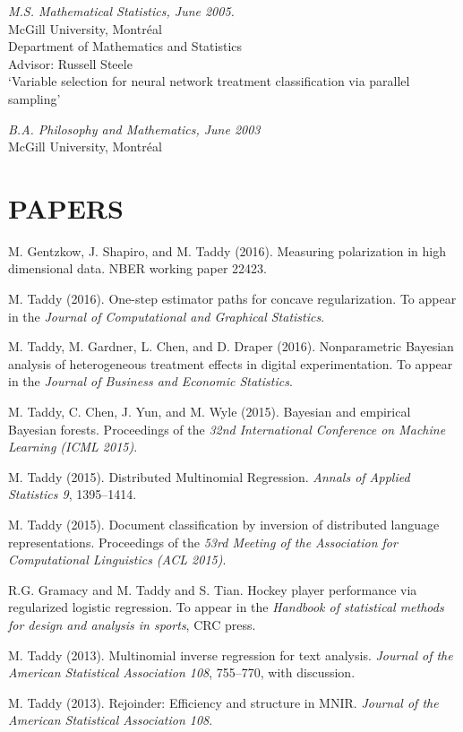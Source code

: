 \documentclass[margin,line]{res}
\begin{document}
\begin{resume}
\vspace{-0.2cm}
{\it M.S. Mathematical Statistics, June 2005.}\\
{\sc McGill University, Montr\'eal}\\
Department of Mathematics and Statistics\\
Advisor: Russell Steele\\
`Variable selection for neural network treatment classification via parallel sampling'

\vspace{-0.2cm}
{\it B.A. Philosophy and Mathematics, June 2003}\\
{\sc McGill University, Montr\'eal}


\section{\bf PAPERS}


M. Gentzkow, J. Shapiro, and M. Taddy (2016).  Measuring polarization in high dimensional data. NBER working paper 22423.

M. Taddy (2016). One-step estimator paths for concave regularization.  To appear in the {\em Journal of Computational and Graphical Statistics}.

M. Taddy, M. Gardner, L. Chen, and D. Draper (2016).  Nonparametric Bayesian analysis of heterogeneous treatment effects in digital experimentation.  To appear in the {\em Journal of Business and Economic Statistics}.

M. Taddy, C. Chen, J. Yun, and M. Wyle (2015). Bayesian and empirical Bayesian forests.  Proceedings of the {\em 32nd International Conference on Machine Learning (ICML 2015)}.

M. Taddy (2015). Distributed Multinomial Regression.  {\em Annals of Applied Statistics 9}, 1395--1414.

M. Taddy (2015). Document classification by inversion of distributed language representations. Proceedings of the {\em 53rd Meeting of the Association for Computational Linguistics (ACL 2015)}.

R.G. Gramacy and M. Taddy and S. Tian.  Hockey player performance via regularized logistic regression.
To appear in the {\it Handbook of statistical methods for design and analysis in sports}, CRC press.

M. Taddy (2013).  Multinomial inverse regression for text analysis.  
{\it Journal of the American Statistical
  Association 108}, 755--770, with discussion.

M. Taddy (2013).   Rejoinder: Efficiency and structure in MNIR.  {\it Journal of the American Statistical
  Association 108}.




\end{resume}
\end{document}
